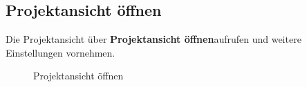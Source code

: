 \subsection{Projektansicht öffnen}
Die Projektansicht über \glqq\textbf{Projektansicht öffnen}\grqq\:aufrufen und weitere Einstellungen vornehmen.
\begin{figure}[H]
   \centering
   \caption[Projektansicht öffnen]{Projektansicht öffnen}
   \label{fig:Bild2.3}
\end{figure}